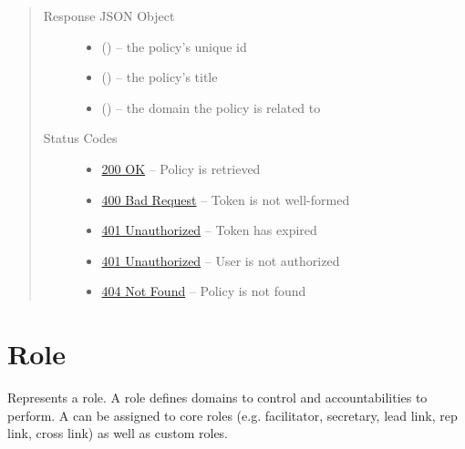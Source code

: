 \documentclass[letterpaper,10pt,english]{sphinxmanual}
\begin{document}
\begin{fulllineitems}
\begin{quote}
\begin{description}
\begin{itemize}
\end{itemize}

\item[{Response JSON Object}] \leavevmode\begin{itemize}
\item {} 
 () -- the policy's unique id

\item {} 
 () -- the policy's title

\item {} 
 () -- the domain the policy is related to

\end{itemize}

\item[{Status Codes}] \leavevmode\begin{itemize}
\item {} 
\href{http://www.w3.org/Protocols/rfc2616/rfc2616-sec10.html\#sec10.2.1}{200 OK} -- Policy is retrieved

\item {} 
\href{http://www.w3.org/Protocols/rfc2616/rfc2616-sec10.html\#sec10.4.1}{400 Bad Request} -- Token is not well-formed

\item {} 
\href{http://www.w3.org/Protocols/rfc2616/rfc2616-sec10.html\#sec10.4.2}{401 Unauthorized} -- Token has expired

\item {} 
\href{http://www.w3.org/Protocols/rfc2616/rfc2616-sec10.html\#sec10.4.2}{401 Unauthorized} -- User is not authorized

\item {} 
\href{http://www.w3.org/Protocols/rfc2616/rfc2616-sec10.html\#sec10.4.5}{404 Not Found} -- Policy is not found

\end{itemize}

\end{description}\end{quote}

\end{fulllineitems}



\section{Role}
\label{\detokenize{resources/role::doc}}\label{\detokenize{resources/role:id1}}\label{\detokenize{resources/role:role}}
Represents a role. A role defines domains to control and accountabilities to perform. A {\hyperref[\detokenize{resources/partner:partner}]{}} can be assigned to core roles (e.g. facilitator, secretary, lead link, rep link, cross link) as well as custom roles.
\end{document}
